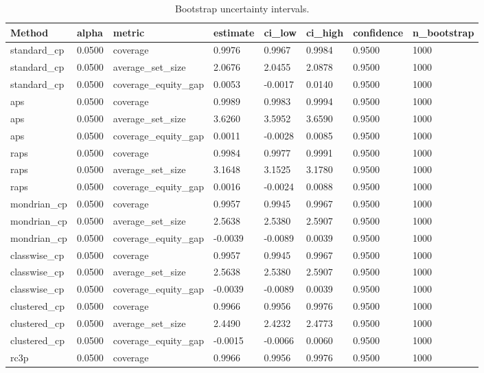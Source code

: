 \begin{table}[htbp]
\centering
\caption{Bootstrap uncertainty intervals.}
\label{tab:bootstrap\_intervals}
\begin{tabular}{llllllll}
\hline
Method & alpha & metric & estimate & ci\_low & ci\_high & confidence & n\_bootstrap \\
\hline
standard\_cp & 0.0500 & coverage & 0.9976 & 0.9967 & 0.9984 & 0.9500 & 1000 \\
standard\_cp & 0.0500 & average\_set\_size & 2.0676 & 2.0455 & 2.0878 & 0.9500 & 1000 \\
standard\_cp & 0.0500 & coverage\_equity\_gap & 0.0053 & -0.0017 & 0.0140 & 0.9500 & 1000 \\
aps & 0.0500 & coverage & 0.9989 & 0.9983 & 0.9994 & 0.9500 & 1000 \\
aps & 0.0500 & average\_set\_size & 3.6260 & 3.5952 & 3.6590 & 0.9500 & 1000 \\
aps & 0.0500 & coverage\_equity\_gap & 0.0011 & -0.0028 & 0.0085 & 0.9500 & 1000 \\
raps & 0.0500 & coverage & 0.9984 & 0.9977 & 0.9991 & 0.9500 & 1000 \\
raps & 0.0500 & average\_set\_size & 3.1648 & 3.1525 & 3.1780 & 0.9500 & 1000 \\
raps & 0.0500 & coverage\_equity\_gap & 0.0016 & -0.0024 & 0.0088 & 0.9500 & 1000 \\
mondrian\_cp & 0.0500 & coverage & 0.9957 & 0.9945 & 0.9967 & 0.9500 & 1000 \\
mondrian\_cp & 0.0500 & average\_set\_size & 2.5638 & 2.5380 & 2.5907 & 0.9500 & 1000 \\
mondrian\_cp & 0.0500 & coverage\_equity\_gap & -0.0039 & -0.0089 & 0.0039 & 0.9500 & 1000 \\
classwise\_cp & 0.0500 & coverage & 0.9957 & 0.9945 & 0.9967 & 0.9500 & 1000 \\
classwise\_cp & 0.0500 & average\_set\_size & 2.5638 & 2.5380 & 2.5907 & 0.9500 & 1000 \\
classwise\_cp & 0.0500 & coverage\_equity\_gap & -0.0039 & -0.0089 & 0.0039 & 0.9500 & 1000 \\
clustered\_cp & 0.0500 & coverage & 0.9966 & 0.9956 & 0.9976 & 0.9500 & 1000 \\
clustered\_cp & 0.0500 & average\_set\_size & 2.4490 & 2.4232 & 2.4773 & 0.9500 & 1000 \\
clustered\_cp & 0.0500 & coverage\_equity\_gap & -0.0015 & -0.0066 & 0.0060 & 0.9500 & 1000 \\
rc3p & 0.0500 & coverage & 0.9966 & 0.9956 & 0.9976 & 0.9500 & 1000 \\

\end{tabular}
\end{table}
